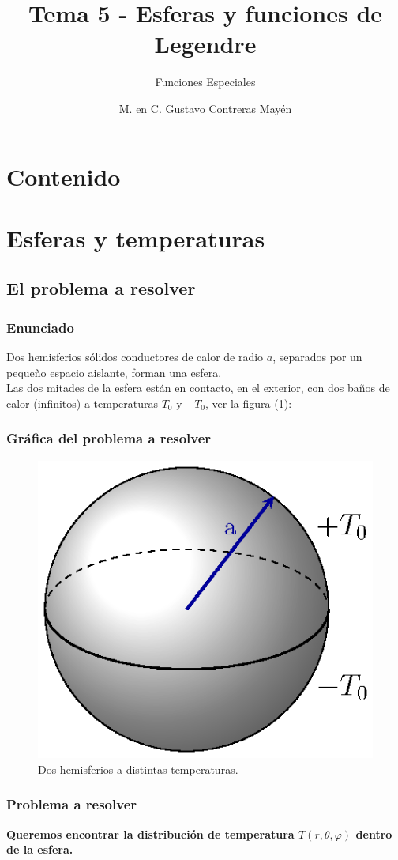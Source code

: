 \documentclass[12pt]{beamer}
\date{}
\title{\large{Tema 5 - Esferas y funciones de Legendre}}
\subtitle{Funciones Especiales}
\author{M. en C. Gustavo Contreras Mayén}
\begin{document}
\maketitle
\fontsize{14}{14}\selectfont
{}

\section*{Contenido}

\section{Esferas y temperaturas}
\subsection{El problema a resolver}

\begin{frame}
\frametitle{Enunciado}
Dos hemisferios sólidos conductores de calor de radio $a$, separados por un pequeño espacio aislante, forman una esfera.
\\
\bigskip
\pause
Las dos mitades de la esfera están en contacto, en el exterior, con dos baños de calor (infinitos) a temperaturas $T_{0}$ y $-T_{0} $, ver la figura (\ref{fig:figura_esfera_01}):
\end{frame}
\begin{frame}\label{figura_esferas}
\frametitle{Gráfica del problema a resolver}
\begin{figure}[H]
    \centering
    \includegraphics[scale=0.95]{Imagenes/Ejemplo_Esfera_01.eps}
    \caption{Dos hemisferios a distintas temperaturas.}
    \label{fig:figura_esfera_01}
\end{figure}
\hyperlink{llama_figura_esferas}{}
\end{frame}
\begin{frame}
\frametitle{Problema a resolver}
\textbf{Queremos encontrar la distribución de temperatura $T(r, \theta, \varphi)$ dentro de la esfera.}
\end{frame}
\end{document}
